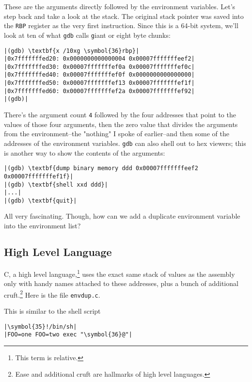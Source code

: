 \documentclass[10pt,a4paper]{article}
\begin{document}
These are the arguments directly followed by the environment variables.
Let's step back and take a look at the stack. The original stack pointer
was saved into the \texttt{RBP} register as the very first instruction.
Since this is a 64-bit system, we'll look at ten of what \texttt{gdb}
calls \texttt{g}iant or eight byte chunks:

\begin{lstlisting}
|(gdb) \textbf{x /10xg \symbol{36}rbp}|
|0x7fffffffed20: 0x0000000000000004 0x00007fffffffeef2|
|0x7fffffffed30: 0x00007fffffffef0a 0x00007fffffffef0c|
|0x7fffffffed40: 0x00007fffffffef0f 0x0000000000000000|
|0x7fffffffed50: 0x00007fffffffef13 0x00007fffffffef1f|
|0x7fffffffed60: 0x00007fffffffef2a 0x00007fffffffef92|
|(gdb)|
\end{lstlisting}

There's the argument count \texttt{4} followed by the four addresses
that point to the values of those four arguments, then the zero value
that divides the arguments from the environment--the "nothing" I spoke
of earlier--and then some of the addresses of the environment variables.
\texttt{gdb} can also shell out to hex viewers; this is another way to
show the contents of the arguments:

\begin{lstlisting}
|(gdb) \textbf{dump binary memory ddd 0x00007fffffffeef2 0x00007fffffffef1f}|
|(gdb) \textbf{shell xxd ddd}|
|...|
|(gdb) \textbf{quit}|
\end{lstlisting}

All very fascinating. Though, how can we add a duplicate environment
variable into the environment list?

\subsection*{High Level Language}

C, a high level language,\footnote{This term is relative.} uses the
exact same stack of values as the assembly only with handy names
attached to these addresses, plus a bunch of additional
cruft.\footnote{Ease and additional cruft are hallmarks of high level
languages.} Here is the file \texttt{envdup.c}.



This is similar to the shell script

\begin{lstlisting}
|\symbol{35}!/bin/sh|
|FOO=one FOO=two exec "\symbol{36}@"|
\end{lstlisting}
\end{document}
